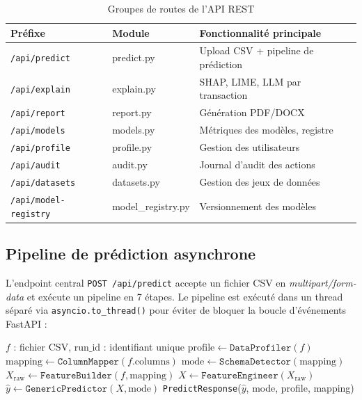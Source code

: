 \documentclass[12pt,a4paper,twoside]{report}
\theoremstyle{definition}
\begin{document}
\begin{table}[H]
\centering
\caption{Groupes de routes de l'API REST}
\label{tab:routes}
\renewcommand{\arraystretch}{1.3}
\begin{tabular}{lll}
\toprule
\textbf{Préfixe} & \textbf{Module} & \textbf{Fonctionnalité principale} \\
\midrule
\texttt{/api/predict} & predict.py & Upload CSV + pipeline de prédiction \\
\texttt{/api/explain} & explain.py & SHAP, LIME, LLM par transaction \\
\texttt{/api/report} & report.py & Génération PDF/DOCX \\
\texttt{/api/models} & models.py & Métriques des modèles, registre \\
\texttt{/api/profile} & profile.py & Gestion des utilisateurs \\
\texttt{/api/audit} & audit.py & Journal d'audit des actions \\
\texttt{/api/datasets} & datasets.py & Gestion des jeux de données \\
\texttt{/api/model-registry} & model\_registry.py & Versionnement des modèles \\
\bottomrule
\end{tabular}
\end{table}

\subsection{Pipeline de prédiction asynchrone}
L'endpoint central \texttt{POST /api/predict} accepte un fichier CSV en
\textit{multipart/form-data} et exécute un pipeline en 7 étapes. Le pipeline
est exécuté dans un thread séparé via \texttt{asyncio.to\_thread()} pour éviter
de bloquer la boucle d'événements FastAPI :

\begin{algorithm}[H]
\caption{Pipeline de prédiction complet (predict.py)}
\label{alg:predict_pipeline}
\begin{algorithmic}[1]
\Require $f$ : fichier CSV, $\text{run\_id}$ : identifiant unique
\State $\text{profile} \leftarrow \texttt{DataProfiler}(f)$
\State $\text{mapping} \leftarrow \texttt{ColumnMapper}(f.\text{columns})$
\State $\text{mode} \leftarrow \texttt{SchemaDetector}(\text{mapping})$
\State $X_{\text{raw}} \leftarrow \texttt{FeatureBuilder}(f, \text{mapping})$
\State $X \leftarrow \texttt{FeatureEngineer}(X_{\text{raw}})$
\State $\hat{y} \leftarrow \texttt{GenericPredictor}(X, \text{mode})$
\State \Return \texttt{PredictResponse}($\hat{y}$, mode, profile, mapping)
\end{algorithmic}
\end{algorithm}
\end{document}
